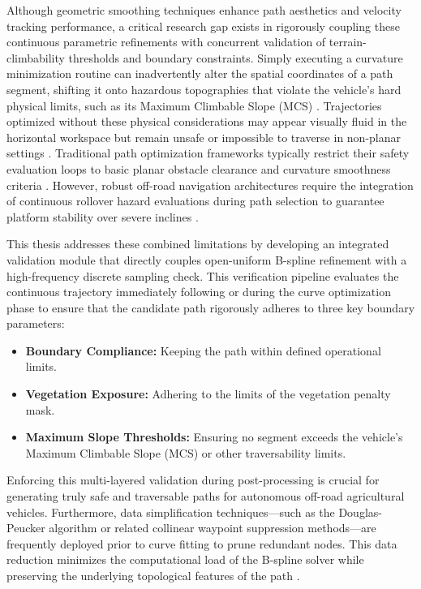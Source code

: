 Although geometric smoothing techniques enhance path aesthetics and velocity tracking performance, a
critical research gap exists in rigorously coupling these continuous parametric refinements with
concurrent validation of terrain-climbability thresholds and boundary constraints. Simply executing
a curvature minimization routine can inadvertently alter the spatial coordinates of a path segment,
shifting it onto hazardous topographies that violate the vehicle's hard physical limits, such as its
Maximum Climbable Slope (MCS) \citep{Frey_2022_selfsupervisedneartofar}. Trajectories optimized without these physical
considerations may appear visually fluid in the horizontal workspace but remain unsafe or impossible
to traverse in non-planar settings \citep{Frey_2022_selfsupervisedneartofar}. Traditional path optimization frameworks typically
restrict their safety evaluation loops to basic planar obstacle clearance and curvature smoothness
criteria \citep{Karur_2021_surveypath, Overbye_2022_localoffroad}. However, robust off-road navigation architectures require the
integration of continuous rollover hazard evaluations during path selection to guarantee platform
stability over severe inclines \citep{Li_2019_rolloverfreepath}.

This thesis addresses these combined limitations by developing an integrated validation module that
directly couples open-uniform B-spline refinement with a high-frequency discrete sampling check.
This verification pipeline evaluates the continuous trajectory immediately following or during the
curve optimization phase to ensure that the candidate path rigorously adheres to three key boundary
parameters:

\begin{itemize}
    \item \textbf{Boundary Compliance:} Keeping the path within defined operational limits.
    \item \textbf{Vegetation Exposure:} Adhering to the limits of the vegetation penalty mask.
    \item \textbf{Maximum Slope Thresholds:} Ensuring no segment exceeds the vehicle's Maximum Climbable Slope (MCS) or other traversability limits.
\end{itemize}

Enforcing this multi-layered validation during post-processing is crucial for generating truly safe
and traversable paths for autonomous off-road agricultural vehicles. Furthermore, data
simplification techniques---such as the Douglas-Peucker algorithm or related collinear waypoint
suppression methods---are frequently deployed prior to curve fitting to prune redundant nodes. This
data reduction minimizes the computational load of the B-spline solver while preserving the
underlying topological features of the path \citep{Chen_2023_improvedastar, Liao_2023_researchpath}.

